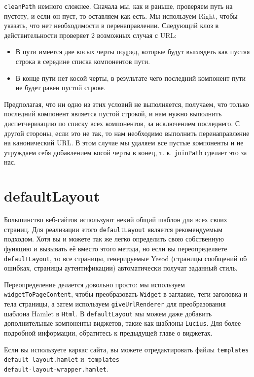 \lstinline!cleanPath! немного сложнее. Сначала мы, как и раньше, проверяем путь
на пустоту, и если он пуст, то оставляем как есть. Мы используем Right, чтобы
указать, что нет необходимости в перенаправлении. Следующий клоз в
действительности проверяет 2 возможных случая с URL:

\begin{itemize}
  \item В пути имеется две косых черты подряд, которые будут выглядеть как
      пустая строка в середине списка компонентов пути.

  \item В конце пути нет косой черты, в результате чего последний компонент
      пути не будет равен пустой строке.
\end{itemize}

Предполагая, что ни одно из этих условий не выполняется, получаем, что только
последний компонент является пустой строкой, и нам нужно выполнить
диспетчеризацию по списку всех компонентов, за исключением последнего. С другой
стороны, если это не так, то нам необходимо выполнить перенаправление на
канонический URL. В этом случае мы удаляем все пустые компоненты и не утруждаем
себя добавлением косой черты в конец, т. к. \lstinline!joinPath! сделает это за
нас.

\section {defaultLayout}

Большинство веб-сайтов используют некий общий шаблон для всех своих страниц.
Для реализации этого \lstinline!defaultLayout! является рекомендуемым подходом.
Хотя вы и можете так же легко определить свою собственную функцию и вызывать её
вместо этого метода, но если вы переопределяете \lstinline!defaultLayout!, то
все страницы, генерируемые Yesod (страницы сообщений об ошибках, страницы
аутентификации) автоматически получат заданный стиль.

Переопределение делается довольно просто: мы используем
\lstinline!widgetToPageContent!, чтобы преобразовать \lstinline!Widget! в
заглавие, теги заголовка и тела страницы, а затем используем
\lstinline!giveUrlRenderer! для преобразования шаблона Hamlet в
\lstinline!Html!. В \lstinline!defaultLayout! мы можем даже добавить
дополнительные компоненты виджетов, такие как шаблоны \lstinline!Lucius!.
Для более подробной информации, обратитесь к предыдущей главе о виджетах.

Если вы используете каркас сайта, вы можете отредактировать файлы
\texttt{templates\\default-layout.hamlet}
и~\texttt{templates\\default-layout-wrapper.hamlet}.

